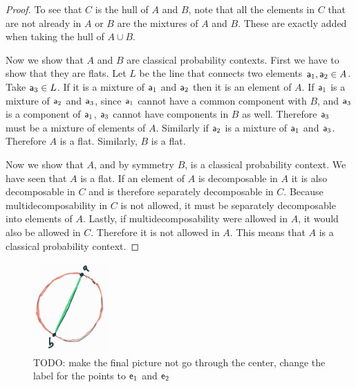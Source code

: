 \begin{mathSection}
\begin{proof}
	To see that $C$ is the hull of $A$ and $B$, note that all the elements in $C$ that are not already in $A$ or $B$ are the mixtures of $A$ and $B$. These are exactly added when taking the hull of $A \cup B$.
	
	Now we show that $A$ and $B$ are classical probability contexts. First we have to show that they are flats. Let $L$ be the line that connects two elements $\ens[a]_1, \ens[a]_2 \in A$. Take $\ens[a]_3 \in L$. If it is a mixture of $\ens[a]_1$ and $\ens[a]_2$ then it is an element of $A$. If $\ens[a]_1$ is a mixture of $\ens[a]_2$ and $\ens[a]_3$, since $\ens[a]_1$ cannot have a common component with $B$, and $\ens[a]_3$ is a component of $\ens[a]_1$, $\ens[a]_3$ cannot have components in $B$ as well. Therefore $\ens[a]_3$ must be a mixture of elements of $A$. Similarly if $\ens[a]_2$ is a mixture of $\ens[a]_1$ and $\ens[a]_3$. Therefore $A$ is a flat. Similarly, $B$ is a flat.
	
	Now we show that $A$, and by symmetry $B$, is a classical probability context. We have seen that $A$ is a flat. If an element of $A$ is decomposable in $A$ it is also decomposable in $C$ and is therefore separately decomposable in $C$. Because multidecomposability in $C$ is not allowed, it must be separately decomposable into elements of $A$. Lastly, if multidecomposability were allowed in $A$, it would also be allowed in $C$. Therefore it is not allowed in $A$. This means that $A$ is a classical probability context.
\end{proof}

\begin{figure}[H]
	\centering
	\includegraphics[width=0.25\textwidth]{tempimages/CounterexampleProbabilityContexts.jpg}
	\caption{TODO: make the final picture not go through the center, change the label for the points to $\ens_1$ and $\ens_2$}
\end{figure}


\end{mathSection}
